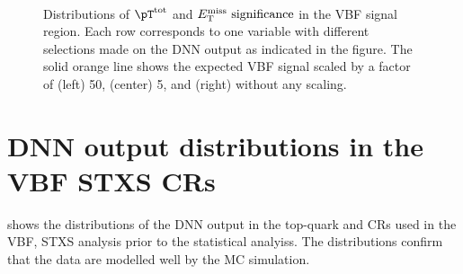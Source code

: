\begin{figure}[h]
{        } \\
        {\caption{Distributions of $\pttot$ and $E_{\text{T}}^{\text{miss}} \text{ significance}$ in the VBF \TwoJet signal region.
            Each row corresponds to one variable with different selections made on the DNN output as indicated in the figure. The solid orange line shows the expected VBF signal scaled by a factor of (left) 50, (center) 5, and (right) without any scaling.
            \label{fig:dnn-inputs-top-sup} }}
    \end{figure}

    \FloatBarrier
    \section{DNN output distributions in the VBF STXS CRs}
     shows the distributions of the DNN output in the top-quark and \Ztautau CRs used in the VBF, STXS analysis prior to the statistical analyiss.
    The distributions confirm that the data are modelled well by the MC simulation.

